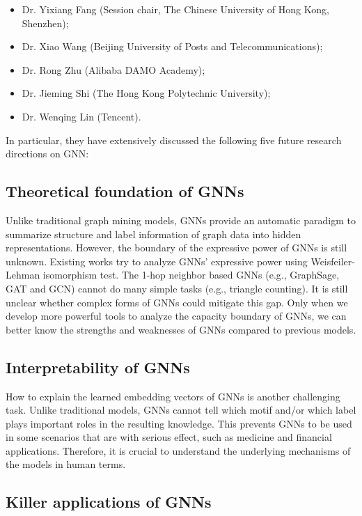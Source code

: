 \documentclass[11pt,dvipdfm]{article}
\begin{document}
\begin{itemize}
\item Dr. Yixiang Fang (Session chair, The Chinese University of Hong Kong, Shenzhen);
\item Dr. Xiao Wang (Beijing University of Posts and Telecommunications);
\item Dr. Rong Zhu (Alibaba DAMO Academy);
\item Dr. Jieming Shi (The Hong Kong Polytechnic University);
\item Dr. Wenqing Lin (Tencent).
\end{itemize}

In particular, they have extensively discussed the following five future research directions on GNN:

\subsection{Theoretical foundation of GNNs}

Unlike traditional graph mining models, GNNs provide an automatic paradigm to summarize structure and label information of graph data into hidden representations. However, the boundary of the expressive power of GNNs is still unknown. Existing works try to analyze GNNs' expressive power using Weisfeiler-Lehman isomorphism test. The 1-hop neighbor based GNNs (e.g., GraphSage, GAT and GCN) cannot do many simple tasks (e.g., triangle counting). It is still unclear whether complex forms of GNNs could mitigate this gap. Only when we develop more powerful tools to analyze the capacity boundary of GNNs, we can better know the strengths and weaknesses of GNNs compared to previous models.

\subsection{Interpretability of GNNs}

How to explain the learned embedding vectors of GNNs is another challenging task. Unlike traditional models, GNNs cannot tell which motif and/or which label plays important roles in the resulting knowledge. This prevents GNNs to be used in some scenarios that are with serious effect, such as medicine and financial applications. Therefore, it is crucial to understand the underlying mechanisms of the models in human terms.

\subsection{Killer applications of GNNs}
\end{document}
